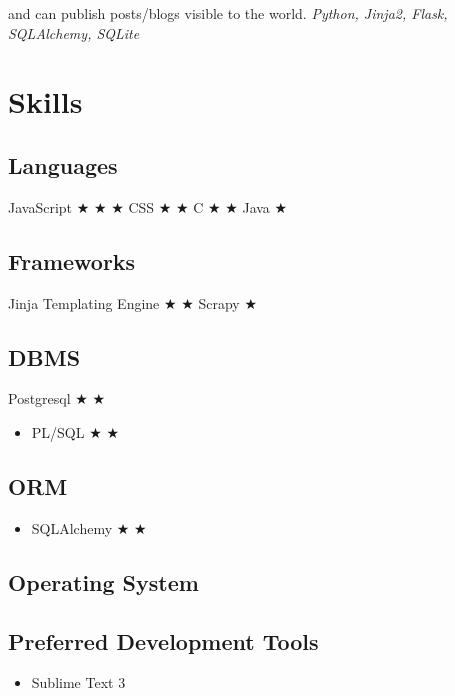\documentclass{ss_resume}
\begin{document}
and can publish posts/blogs visible to the world. \hfill \textit{Python, Jinja2, Flask, SQLAlchemy, SQLite}

\section{Skills}

\subsection{Languages}
 {JavaScript  $\bigstar$   $\bigstar$   $\bigstar$ }
 {CSS  $\bigstar$  $\bigstar$ }
 {C  $\bigstar$ $\bigstar$ }
 {Java  $\bigstar$ }

\subsection{Frameworks}
 {Jinja Templating Engine  $\bigstar$  $\bigstar$ }
 {Scrapy  $\bigstar$ }

\subsection{DBMS}
 {Postgresql  $\bigstar$  $\bigstar$  }
\begin{itemize}
    \item {PL/SQL $\bigstar$  $\bigstar$  }
\end{itemize}

\subsection{ORM}
\begin{itemize}
    \item {SQLAlchemy $\bigstar$  $\bigstar$  }
\end{itemize}

\subsection{Operating System}

\subsection{Preferred Development Tools}
\begin{itemize}
    \item Sublime Text 3
\end{itemize}
\end{document}
